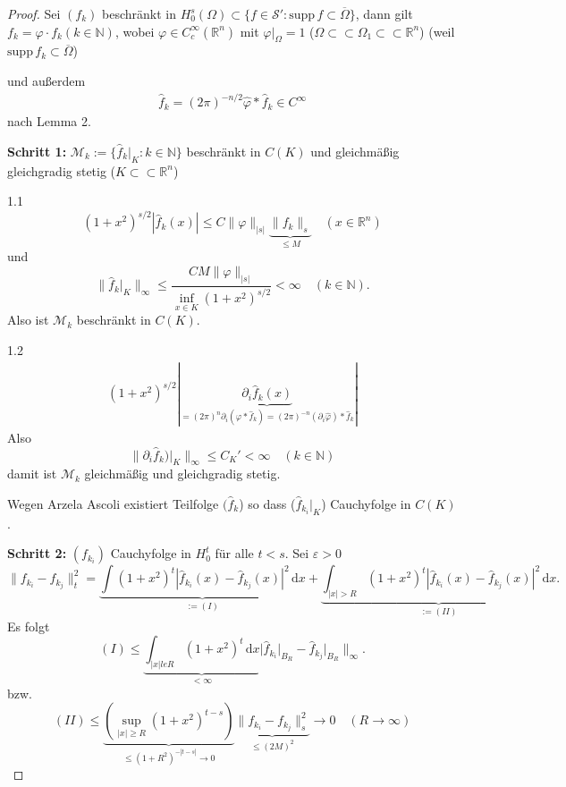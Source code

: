 \documentclass[
paper=a4,
bibtotocnumbered,
liststotocnumbered,
tablecaptionabove,
pointlessnumbers,
twoside,
openright,
10pt
]
{report}
\newcommand{\supp}{\mathrm{supp}\,}
\let\phi\varphi
\theoremstyle{definition}
\numberwithin{equation}{chapter}
\begin{document}
\begin{proof}
Sei $(f_k)$ beschränkt in $H_0^s(\Omega) \subset \{f\in \mathcal S': \supp f\subset \overline \Omega \}$, dann gilt $f_k=\phi \cdot f_k (k\in \mathbb N)$, wobei $\phi \in C_c^\infty(\mathbb R^n)$ mit $\phi|_{\Omega} =1$ ($\Omega \subset \subset \Omega_1 \subset \subset \mathbb R^n$) (weil $\supp f_k \subset \overline \Omega$)

und außerdem
\begin{gather}
\hat f_k = (2\pi)^{-n/2} \hat \phi * \hat f_k \in C^\infty
\end{gather}
nach Lemma 2.

\textbf{Schritt 1:} $\mathcal M_k:= \{\hat f_k\big |_K : k\in \mathbb N\}$ beschränkt in $C(K)$ und gleichmäßig gleichgradig stetig ($K\subset \subset \mathbb R^n$)

1.1
\begin{equation}
(1+x^2)^{s/2} | \hat f_k(x)| \le C \| \phi\|_{|s|} \underbrace{\| f_k\|_s}_{\le M} \quad (x\in \mathbb R^n)
\end{equation}
und $$\| \hat f_k\big |_K\|_\infty \le \frac{CM\|\phi\|_{|s|}}{\inf_{x\in K} (1+x^2)^{s/2}} <\infty \quad (k\in \mathbb N).$$
Also ist $\mathcal M_k$ beschränkt in $C(K)$.

1.2 
\begin{gather}
(1+x^2)^{s/2} |\underbrace{\partial_i \hat f_k(x)}_{= (2\pi)^{n} \partial_i(\hat \phi * \hat f_k)=(2\pi)^{-n} (\partial_i \hat \phi) * \hat f_k}|
\end{gather}
Also
\begin{equation}
\|\partial_i \hat f_k)\big |_K \|_\infty \le C_K' <\infty \quad (k\in \mathbb N)
\end{equation}
damit ist $\mathcal M_k$ gleichmäßig und gleichgradig stetig.

Wegen Arzela Ascoli existiert Teilfolge $(\hat f_k$) so dass ($\hat f_{k_i}\big |_K$) Cauchyfolge in $C(K)$.

\textbf{Schritt 2:} $(f_{k_i})$ Cauchyfolge in $H_0^t$ für alle $t<s$. Sei $\varepsilon>0$
\begin{equation}
\|f_{k_i} - f_{k_j}\|_t^2 = \underbrace{\int (1+x^2)^t |\hat f_{k_i}(x) - \hat f_{k_j}(x)|^2\, \mathrm dx}_{:=(I)} + \underbrace{\int_{|x|>R} (1+x^2)^t | \hat f_{k_i}(x) - \hat f_{k_j} (x) |^2\, \mathrm dx}_{:=(II)}.
\end{equation}
Es folgt 
\begin{equation}
(I) \le \underbrace{\int_{|x|le R} (1+x^2)^t\, \mathrm dx}_{<\infty} | \hat f_{k_i}\big |_{B_R} - \hat f_{k_j}\big |_{B_R} \|_\infty.
\end{equation}
bzw.
\begin{equation}
(II) \le \underbrace{(\sup_{|x|\ge R} (1+x^2)^{t-s} )}_{\le (1+R^2)^{-|t-s|} \to 0} \underbrace{\| f_{k_i} - f_{k_j}\|_s^2}_{\le (2M)^2} \to 0 \quad (R\to \infty)
\end{equation}
\end{proof}
\end{document}
